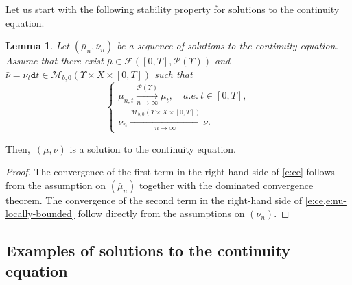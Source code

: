 \documentclass[JEP,XML,SOM,Unicode,published]{cedram}
\newtheorem{lemma}[theorem]{Lemma}
\theoremstyle{definition}
\theoremstyle{remark}
\begin{document}
Let us start with the following stability property for solutions to the continuity equation.
\begin{lemma}\label{t:ce-stability-limit}
Let $(\bar{\mu}_{n}, \bar{\nu}_{n})$ be a sequence of solutions to the continuity equation.
Assume that there exist $\bar{\mu} \in \mathscr{F}([0,T], \mathscr{P}(\varUpsilon))$ and $\bar{\nu} = \nu_{t} \mathtt{d} t \in \mathscr{M}_{b,0}(\varUpsilon \times X \times [0,T])$ such that
\begin{equation*}
\begin{cases}
\mu_{n,t} \xrightarrow[n \to \infty]{\mathscr{P}(\varUpsilon)} \mu_{t}, \quad a.e.\ t \in [0,T],
\\[8pt]
\bar{\nu}_{n} \xrightarrow[n \to \infty]{\mathscr{M}_{b,0}(\varUpsilon \times X \times [0,T])} \bar{\nu}.
\end{cases}
\end{equation*}
\end{lemma}
Then,~$(\bar{\mu},\bar{\nu})$ is a solution to the continuity equation.

\begin{proof}
The convergence of the first term in the right-hand side of \cref{e:ce} follows from the assumption on $(\bar{\mu}_{n})$ together with the dominated convergence theorem.
The convergence of the second term in the right-hand side of \cref{e:ce,e:nu-locally-bounded} follow directly from the assumptions on $(\bar{\nu}_{n})$.
\end{proof}

\subsection{Examples of solutions to the continuity equation}
\end{document}
